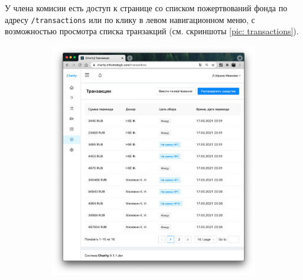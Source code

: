 \documentclass[a4paper,12pt,reqno]{article}
\begin{document}
   У члена комисии есть доступ к странице со списком пожертвований фонда по адресу \texttt{/transactions} или по клику в левом навигационном меню, с возможностью просмотра списка транзакций (см. скриншоты \ref{pic: transactions}). 
    
    \begin{figure}[H]
	    \centering
		\begin{subfigure}[b]{0.475\linewidth}
			\includegraphics[width=\linewidth]{img/ro/transactions.png}
		\end{subfigure}
		\begin{subfigure}[b]{0.475\linewidth}

\end{subfigure}
\end{figure}
\end{document}

